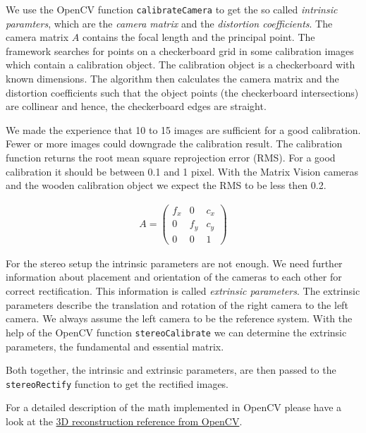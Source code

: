 \documentclass[11pt]{article}
\begin{document}
We use the OpenCV function \texttt{calibrateCamera} to get the so called  \emph{intrinsic paramters}, which are the \emph{camera matrix} and the \emph{distortion coefficients}. The camera matrix $A$ contains the focal length and the principal point. The framework searches for points on a checkerboard grid in some calibration images which contain a calibration object. The calibration object is a checkerboard with known dimensions. The algorithm then calculates the camera matrix and the distortion coefficients such that the object points (the checkerboard intersections)  are collinear and hence, the checkerboard edges are straight.%

We made the experience that 10 to 15 images are sufficient for a good calibration. Fewer or more images could downgrade the calibration result. The calibration function returns the root mean square reprojection error (RMS). For a good calibration it should be between 0.1 and 1 pixel. With the Matrix Vision cameras and the wooden calibration object we expect the RMS to be less then 0.2.

\begin{align*}
A=
\begin{pmatrix}
f_x & 0 & c_x\\
0 & f_y & c_y\\
0 & 0 & 1
\end{pmatrix}
\end{align*}

For the stereo setup the intrinsic parameters are not enough. We need further information about placement and orientation of the cameras to each other for correct rectification. This information is called \emph{extrinsic parameters}. The extrinsic parameters describe the translation and rotation of the right camera to the left camera. We always assume the left camera to be the reference system. With the help of the OpenCV function \texttt{stereoCalibrate} we can determine the extrinsic parameters, the fundamental and essential matrix.

Both together, the intrinsic and extrinsic parameters, are then passed to the \texttt{stereoRectify} function to get the rectified images.%

\bigskip
For a detailed description of the math implemented in OpenCV please have a look at the \href{http://docs.opencv.org/modules/calib3d/doc/camera_calibration_and_3d_reconstruction.html}{3D reconstruction reference from OpenCV}.
\bigskip
\end{document}
